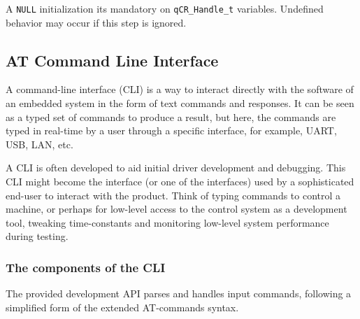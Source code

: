 \hrulefill
\medskip

\begin{tcolorbox}
\HandRight A \lstinline{NULL} initialization its mandatory on \lstinline{qCR_Handle_t} variables. Undefined behavior may occur if this step is ignored.
\end{tcolorbox}

\subsection{AT Command Line Interface} 
A command-line interface (CLI) is a way to interact directly with the software of an embedded system in the form of text commands and responses. It can be seen as a typed set of commands to produce a result, but here, the commands are typed in real-time by a user through a specific interface, for example, UART, USB, LAN, etc. 

A CLI is often developed to aid initial driver development and debugging. This CLI might become the interface (or one of the interfaces) used by a sophisticated end-user to interact with the product. Think of typing commands to control a machine, or perhaps for low-level access to the control system as a development tool, tweaking time-constants and monitoring low-level system performance during testing. 

\subsubsection{The components of the CLI}
The provided development API parses and handles input commands, following a simplified form of the extended AT-commands syntax. 



